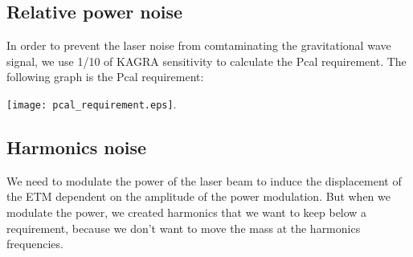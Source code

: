 \subsection{Relative power noise}
In order to prevent the laser noise from comtaminating the gravitational wave signal, we use 1/10 of KAGRA sensitivity to calculate the Pcal requirement. The following graph is the Pcal requirement:
\begin{center}
	\texttt{[image: pcal\_requirement.eps]}.
\end{center}

\subsection{Harmonics noise}
We need to modulate the power of the laser beam to induce the displacement of the ETM dependent on the amplitude of the power modulation.
But when we modulate the power, we created harmonics that we want to keep below a requirement, because we don’t want to move the mass at the harmonics frequencies.
\begin{center}
\end{center}
\begin{center}
\end{center}
\begin{center}
\end{center}
